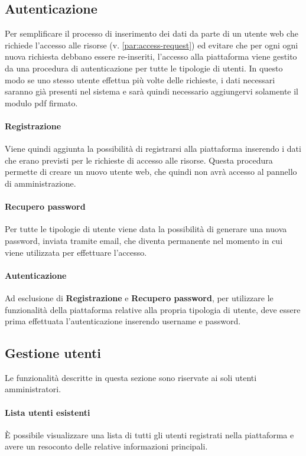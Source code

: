 \subsection{Autenticazione}
Per semplificare il processo di inserimento dei dati da parte di un utente web
che richiede l'accesso alle risorse (v. \ref{par:access-request}) ed evitare che
per ogni ogni nuova richiesta debbano essere re-inseriti, l'accesso alla piattaforma
viene gestito da una procedura di autenticazione per tutte le tipologie di utenti.
In questo modo se uno stesso utente effettua più volte delle richieste, i dati
necessari saranno già presenti nel sistema e sarà quindi necessario aggiungervi
solamente il modulo pdf firmato.

\paragraph{Registrazione}
Viene quindi aggiunta la possibilità di registrarsi alla piattaforma inserendo i
dati che erano previsti per le richieste di accesso alle risorse. Questa procedura
permette di creare un nuovo utente web, che quindi non avrà accesso al pannello
di amministrazione.

\paragraph{Recupero password}
Per tutte le tipologie di utente viene data la possibilità di generare una nuova
password, inviata tramite email, che diventa permanente nel momento in cui
viene utilizzata per effettuare l'accesso.

\paragraph{Autenticazione}
Ad esclusione di \textbf{Registrazione} e \textbf{Recupero password}, per utilizzare
le funzionalità della piattaforma relative alla propria tipologia di utente,
deve essere prima effettuata l'autenticazione inserendo username e password.


\subsection{Gestione utenti}
Le funzionalità descritte in questa sezione sono riservate ai soli utenti
amministratori.

\paragraph{Lista utenti esistenti}
È possibile visualizzare una lista di tutti gli utenti registrati nella piattaforma
e avere un resoconto delle relative informazioni principali.

